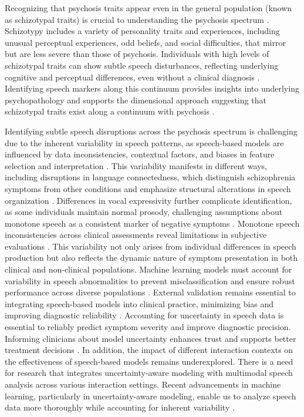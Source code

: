 \documentclass[9pt,a4paper]{rho-class/rho}
\begin{document}
Recognizing that psychosis traits appear even in the general population (known as schizotypal traits) is crucial to understanding the psychosis spectrum \cite{Sarti2025,Kirchhoff2024}. Schizotypy includes a variety of personality traits and experiences, including unusual perceptual experiences, odd beliefs, and social difficulties, that mirror but are less severe than those of psychosis. Individuals with high levels of schizotypal traits can show subtle speech disturbances, reflecting underlying cognitive and perceptual differences, even without a clinical diagnosis \cite{kiang2010schizotypy, minor2010affective, cohen2014normalities}. Identifying speech markers along this continuum provides insights into underlying psychopathology and supports the dimensional approach suggesting that schizotypal traits exist along a continuum with psychosis \cite{mason2015assessment}.

Identifying subtle speech disruptions across the psychosis spectrum is challenging due to the inherent variability in speech patterns, as speech-based models are influenced by data inconsistencies, contextual factors, and biases in feature selection and interpretation \cite{gawlikowski2023survey}. This variability manifests in different ways, including disruptions in language connectedness, which distinguish schizophrenia symptoms from other conditions and emphasize structural alterations in speech organization \cite{voppel2021quantified,He2024,Palominos2024}. Differences in vocal expressivity further complicate identification, as some individuals maintain normal prosody, challenging assumptions about monotone speech as a consistent marker of negative symptoms \cite{cohen2016vocal}. Monotone speech inconsistencies across clinical assessments reveal limitations in subjective evaluations \cite{compton2018aprosody}. This variability not only arises from individual differences in speech production but also reflects the dynamic nature of symptom presentation in both clinical and non-clinical populations. Machine learning models must account for variability in speech abnormalities to prevent misclassification and ensure robust performance across diverse populations \cite{bone2017signal}. External validation remains essential to integrating speech-based models into clinical practice, minimizing bias and improving diagnostic reliability \cite{chekroud2021promise}.  Accounting for uncertainty in speech data is essential to reliably predict symptom severity and improve diagnostic precision. Informing clinicians about model uncertainty enhances trust and supports better treatment decisions \cite{van2023psychosis}.  
In addition, the impact of different interaction contexts on the effectiveness of speech-based models remains underexplored. There is a need for research that integrates uncertainty-aware modeling with multimodal speech analysis across various interaction settings.  Recent advancements in machine learning, particularly in uncertainty-aware modeling, enable us to analyze speech data more thoroughly while accounting for inherent variability \cite{mcknight2023uncertainty,schrufer2024you,  dighe2024leveraging}.
\end{document}
